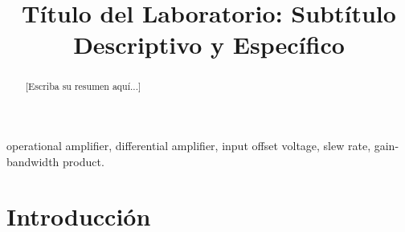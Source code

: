 \documentclass[conference]{IEEEtran}
\begin{document}
\title{Título del Laboratorio: Subtítulo Descriptivo y Específico}

\author{
}

\maketitle

\begin{abstract}
[Escriba su resumen aquí...]
\end{abstract}

\begin{IEEEkeywords}
operational amplifier, differential amplifier, input offset voltage, slew rate, gain-bandwidth product.
\end{IEEEkeywords}

\section{Introducción}
\end{document}
